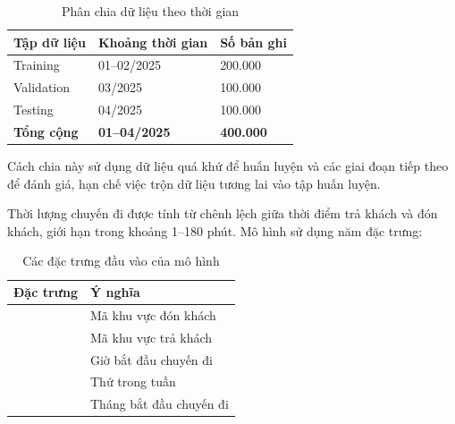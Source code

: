 \begin{table}[!htbp]\centering
\fontsize{12}{15}\selectfont{}
\setlength{\tabcolsep}{4pt}\setlength{\arrayrulewidth}{0.4pt}\renewcommand{\arraystretch}{1.2}
\setlength{\ReportTableWidth}{\dimexpr\linewidth-4\arrayrulewidth\relax}
\begin{tabular}{|L{\tabcolsep\relax}|L{\tabcolsep\relax}|L{\tabcolsep\relax}|}
\hline
\textbf{Tập dữ liệu} & \textbf{Khoảng thời gian} & \textbf{Số bản ghi} \\
\hline
Training & 01–02/2025 & 200.000 \\\hline
Validation & 03/2025 & 100.000 \\\hline
Testing & 04/2025 & 100.000 \\\hline
\textbf{Tổng cộng} & \textbf{01–04/2025} & \textbf{400.000} \\\hline
\end{tabular}
\caption{Phân chia dữ liệu theo thời gian}\label{tab:01}
\end{table}

Cách chia này sử dụng dữ liệu quá khứ để huấn luyện và các giai đoạn tiếp theo để đánh giá, hạn chế việc trộn dữ liệu tương lai vào tập huấn luyện.


Thời lượng chuyến đi được tính từ chênh lệch giữa thời điểm trả khách và đón khách, giới hạn trong khoảng 1–180 phút. Mô hình sử dụng năm đặc trưng:


\begin{table}[!htbp]\centering
\fontsize{12}{15}\selectfont{}
\setlength{\tabcolsep}{4pt}\setlength{\arrayrulewidth}{0.4pt}\renewcommand{\arraystretch}{1.2}
\setlength{\ReportTableWidth}{\dimexpr\linewidth-3\arrayrulewidth\relax}
\begin{tabular}{|L{\tabcolsep\relax}|L{\tabcolsep\relax}|}
\hline
\textbf{Đặc trưng} & \textbf{Ý nghĩa} \\
\hline
{} & Mã khu vực đón khách \\\hline
{} & Mã khu vực trả khách \\\hline
{} & Giờ bắt đầu chuyến đi \\\hline
{} & Thứ trong tuần \\\hline
{} & Tháng bắt đầu chuyến đi \\\hline
\end{tabular}
\caption{Các đặc trưng đầu vào của mô hình}\label{tab:02}
\end{table}

